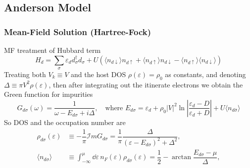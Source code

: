\documentclass[10pt,aspectratio=43,xcolor=x11names]{beamer}%
\begin{document}
	\subsection{Anderson Model}
		\begin{frame}[t]\frametitle{Mean-Field Solution (Hartree-Fock)}
			MF treatment of Hubbard term
			\begin{equation*}
				H_d=\sum_{\sigma}\varepsilon_d d_\sigma^\dagger d_\sigma+U(\langle n_{d\downarrow}\rangle n_{d\uparrow}+\langle n_{d\uparrow}\rangle n_{d\downarrow}-\langle n_{d\uparrow}\rangle \langle n_{d\downarrow}\rangle )
			\end{equation*}
			\pause
			Treating both $V_k\equiv V$ and the host DOS $\rho(\varepsilon)=\rho_0$ as constants, and denoting $\Delta\equiv\pi V^2\rho(\varepsilon)$, then after integrating out the itinerate electrons we obtain the Green function for impurities
			\begin{equation*}
				G_{d\sigma}(\omega)=\dfrac{1}{\omega-E_{d\sigma}+i\Delta},\quad\text{where }E_{d\sigma}=\varepsilon_d+\rho_0 |V|^2\ln\left|\dfrac{\varepsilon_d-D}{\varepsilon_d+D}\right|+U \langle n_{d\bar\sigma} \rangle
			\end{equation*}
			So DOS and the occupation number are
			\begin{align*}
				\rho_{d\sigma}(\varepsilon)&\equiv-\dfrac{1}{\pi}\mathcal{I}m G_{d\sigma}=\dfrac{1}{\pi}\dfrac{\Delta}{(\varepsilon-E_{d\sigma})^2+\Delta^2},\\
				\langle n_{d\sigma}\rangle &\equiv\int_{-\infty}^\mu\dd \varepsilon\, n_F(\varepsilon)\rho_{d\sigma}(\varepsilon)=\dfrac{1}{2}-\arctan\dfrac{E_{d\sigma}-\mu}{\Delta},
			\end{align*}
		\end{frame}
\end{document}
